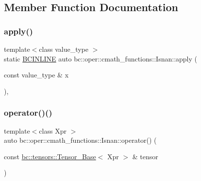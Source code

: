 \subsection{Member Function Documentation}
\mbox{\label{structbc_1_1oper_1_1cmath__functions_1_1Isnan_a3849d715381c4e3be0e246a25ea7ff75}} 
\subsubsection{\texorpdfstring{apply()}{apply()}}
{\footnotesize\ttfamily template$<$class value\+\_\+type $>$ \\
static \hyperlink{common_8h_a6699e8b0449da5c0fafb878e59c1d4b1}{B\+C\+I\+N\+L\+I\+NE} auto bc\+::oper\+::cmath\+\_\+functions\+::\+Isnan\+::apply (\begin{DoxyParamCaption}\item[{const value\+\_\+type \&}]{x }\end{DoxyParamCaption})\hspace{0.3cm}{\ttfamily [inline]}, {\ttfamily [static]}}

\mbox{\label{structbc_1_1oper_1_1cmath__functions_1_1Isnan_a37eb8c5f0effa015649267708915cbd6}} 
\subsubsection{\texorpdfstring{operator()()}{operator()()}\hspace{0.1cm}{\footnotesize\ttfamily [1/3]}}
{\footnotesize\ttfamily template$<$class Xpr $>$ \\
auto bc\+::oper\+::cmath\+\_\+functions\+::\+Isnan\+::operator() (\begin{DoxyParamCaption}\item[{const \hyperlink{classbc_1_1tensors_1_1Tensor__Base}{bc\+::tensors\+::\+Tensor\+\_\+\+Base}$<$ Xpr $>$ \&}]{tensor }\end{DoxyParamCaption})\hspace{0.3cm}{\ttfamily [inline]}}

